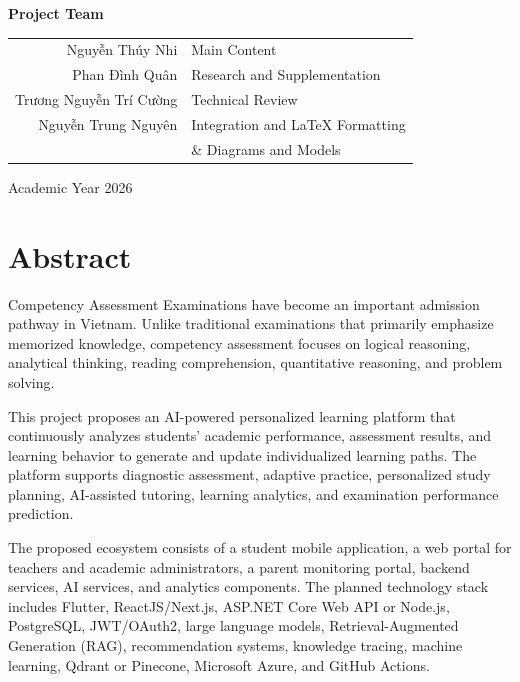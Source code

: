 \documentclass[12pt,a4paper]{report}
\begin{document}
\begin{titlepage}
	\vspace{1.2cm}
	
	
	{\large\bfseries Project Team\par}
	
	\vspace{0.4cm}
	
	\begin{tabular}{r l}
		Nguyễn Thúy Nhi & Main Content \\
		Phan Đình Quân & Research and Supplementation \\
		Trương Nguyễn Trí Cường & Technical Review \\
		Nguyễn Trung Nguyên & Integration and LaTeX Formatting\\
		&\& Diagrams and Models\\
	\end{tabular}
	
	\vfill
	
	{\large Academic Year 2026\par}
	
\end{titlepage}

\chapter*{Abstract}

Competency Assessment Examinations have become an important admission pathway in Vietnam. Unlike traditional examinations that primarily emphasize memorized knowledge, competency assessment focuses on logical reasoning, analytical thinking, reading comprehension, quantitative reasoning, and problem solving.

This project proposes an AI-powered personalized learning platform that continuously analyzes students' academic performance, assessment results, and learning behavior to generate and update individualized learning paths. The platform supports diagnostic assessment, adaptive practice, personalized study planning, AI-assisted tutoring, learning analytics, and examination performance prediction.

The proposed ecosystem consists of a student mobile application, a web portal for teachers and academic administrators, a parent monitoring portal, backend services, AI services, and analytics components. The planned technology stack includes Flutter, ReactJS/Next.js, ASP.NET Core Web API or Node.js, PostgreSQL, JWT/OAuth2, large language models, Retrieval-Augmented Generation (RAG), recommendation systems, knowledge tracing, machine learning, Qdrant or Pinecone, Microsoft Azure, and GitHub Actions.
\end{document}

